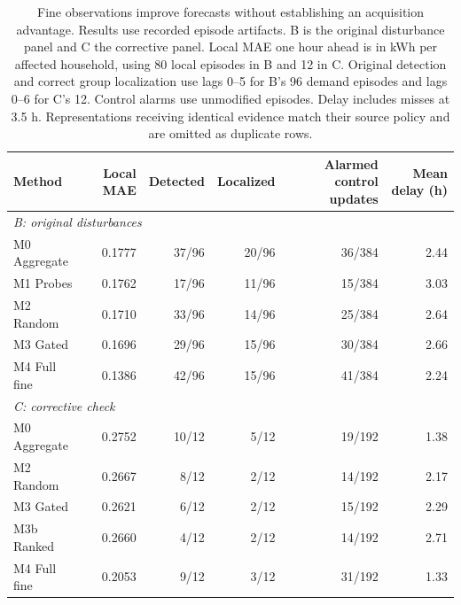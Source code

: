 \documentclass{article}
\begin{document}
\begin{table}[!t]
\caption{Fine observations improve forecasts without establishing an acquisition advantage. Results use recorded episode artifacts. B is the original disturbance panel and C the corrective panel. Local MAE one hour ahead is in kWh per affected household, using 80 local episodes in B and 12 in C. Original detection and correct group localization use lags 0--5 for B's 96 demand episodes and lags 0--6 for C's 12. Control alarms use unmodified episodes. Delay includes misses at 3.5 h. Representations receiving identical evidence match their source policy and are omitted as duplicate rows.}
\label{tab:results}\centering
\begin{tabular}{lrrrrr}\toprule
Method & Local MAE & Detected & Localized & Alarmed control updates & Mean delay (h)\\\midrule
\multicolumn{6}{l}{\textit{B: original disturbances}} \\
M0 Aggregate & 0.1777 & 37/96 & 20/96 & 36/384 & 2.44 \\
M1 Probes & 0.1762 & 17/96 & 11/96 & 15/384 & 3.03 \\
M2 Random & 0.1710 & 33/96 & 14/96 & 25/384 & 2.64 \\
M3 Gated & 0.1696 & 29/96 & 15/96 & 30/384 & 2.66 \\
M4 Full fine & 0.1386 & 42/96 & 15/96 & 41/384 & 2.24 \\
\multicolumn{6}{l}{\textit{C: corrective check}} \\
M0 Aggregate & 0.2752 & 10/12 & 5/12 & 19/192 & 1.38 \\
M2 Random & 0.2667 & 8/12 & 2/12 & 14/192 & 2.17 \\
M3 Gated & 0.2621 & 6/12 & 2/12 & 15/192 & 2.29 \\
M3b Ranked & 0.2660 & 4/12 & 2/12 & 14/192 & 2.71 \\
M4 Full fine & 0.2053 & 9/12 & 3/12 & 31/192 & 1.33 \\
\bottomrule\end{tabular}

\end{table}
\end{document}
